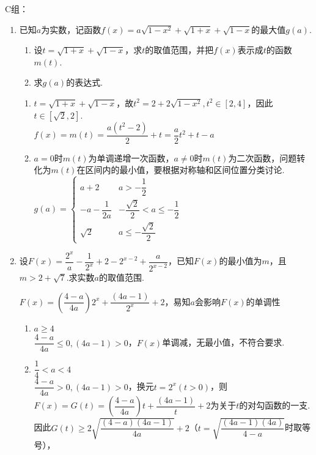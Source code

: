 C组：
\begin{enumerate}
    \item 已知$a$为实数，记函数$f(x) = a\sqrt{1-x^2} + \sqrt{1+x} + \sqrt{1-x}$的最大值$g(a)$.
    \begin{enumerate}
        \item 设$t = \sqrt{1+x} + \sqrt{1-x}$，求$t$的取值范围，并把$f(x)$表示成$t$的函数$m(t)$.
        \item 求$g(a)$的表达式.
    \end{enumerate}
    \begin{jieda}
        \begin{enumerate}
            \item $t = \sqrt{1+x} + \sqrt{1-x}$，故$t^2 = 2 + 2\sqrt{1-x^2}, t^2\in [2, 4]$，因此$t \in [\sqrt{2}, 2]$. \\
            $f(x) = m(t) = \dfrac{a(t^2-2)}{2} + t = \dfrac{a}{2}t^2+t-a$
            \item  $a = 0$时$m(t)$为单调递增一次函数，$a \neq 0$时$m(t)$为二次函数，问题转化为$m(t)$在区间内的最小值，要根据对称轴和区间位置分类讨论. \\
            $g(a) = \left \{ \begin{array}{ll}
                a+2 & a > -\dfrac{1}{2} \\
                -a-\dfrac{1}{2a} & -\dfrac{\sqrt{2}}{2} < a \leq -\dfrac{1}{2} \\
                \sqrt{2} & a \leq -\dfrac{\sqrt{2}}{2}
            \end{array} \right.$
        \end{enumerate}
    \end{jieda}    
    \begin{vspace_}
    \vsp[5]
    \end{vspace_}
    \item 设$F(x) = \dfrac{2^x}{a} - \dfrac{1}{2^x} + 2 - 2^{x-2} + \dfrac{a}{2^{x-2}}$，已知$F(x)$的最小值为$m$，且$m > 2 + \sqrt{7}$.求实数$a$的取值范围.
    \begin{jieda}
        $F(x) = (\dfrac{4-a}{4a})2^x + \dfrac{(4a-1)}{2^x} + 2$，易知$a$会影响$F(x)$的单调性
        \begin{enumerate}
            \item $a \geq 4$ \\
            $\dfrac{4-a}{4a} \leq 0, (4a-1) > 0$，$F(x)$单调减，无最小值，不符合要求.
            \item $\dfrac{1}{4} < a < 4$ \\
            $\dfrac{4-a}{4a} > 0, (4a-1) > 0$，换元$t = 2^x (t > 0)$，则$F(x) = G(t) = (\dfrac{4-a}{4a})t + \dfrac{(4a-1)}{t} + 2$为关于$t$的对勾函数的一支.因此$G(t) \geq 2\sqrt{\dfrac{(4-a)(4a-1)}{4a}}+2$（$t = \sqrt{\dfrac{(4a-1)(4a)}{4-a}}$时取等号），\\

\end{enumerate}
\end{jieda}
\end{enumerate}
